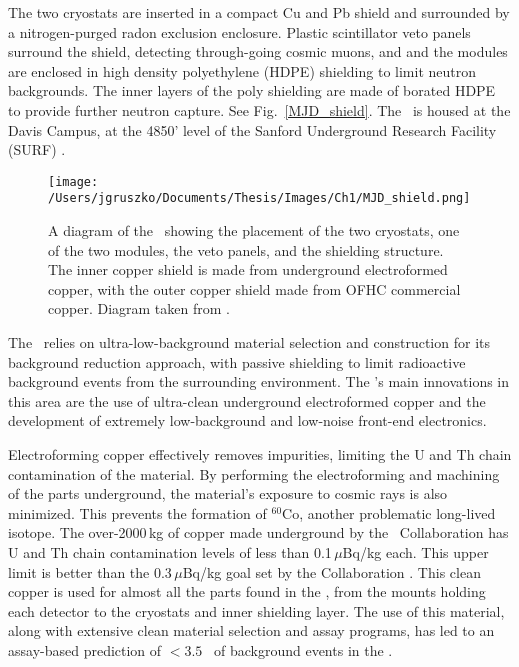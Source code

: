 The two cryostats are inserted in a compact Cu and Pb shield and surrounded by a nitrogen-purged radon exclusion enclosure. Plastic scintillator veto panels surround the shield, detecting through-going cosmic muons, and and the modules are enclosed in high density polyethylene (HDPE) shielding to limit neutron backgrounds. The inner layers of the poly shielding are made of borated HDPE to provide further neutron capture. See Fig.~\ref{MJD_shield}. The \DEM\ is housed at the Davis Campus, at the 4850' level of the Sanford Underground Research Facility (SURF) \cite{MJD2014}. 

\begin{figure}[t]
\centering
\texttt{[image: /Users/jgruszko/Documents/Thesis/Images/Ch1/MJD\_shield.png]}
\caption{A diagram of the \DEM\ showing the placement of the two cryostats, one of the two modules, the veto panels, and the shielding structure. The inner copper shield is made from underground electroformed copper, with the outer copper shield made from OFHC commercial copper. Diagram taken from \cite{MJD2014}.}
\label{fig:MJ_modular}
\end{figure}

The \DEM\ relies on ultra-low-background material selection and construction for its background reduction approach, with passive shielding to limit radioactive background events from the surrounding environment. The \DEM's main innovations in this area are the use of ultra-clean underground electroformed copper and the development of extremely low-background and low-noise front-end electronics. 

Electroforming copper effectively removes impurities, limiting the U and Th chain contamination of the material. By performing the electroforming and machining of the parts underground, the material's exposure to cosmic rays is also minimized. This prevents the formation of $^{60}$Co, another problematic long-lived isotope. The over-2000\,kg of copper made underground by the \MJ\ Collaboration has U and Th chain contamination levels of less than 0.1\,$\mu$Bq/kg each. This upper limit is better than the 0.3\,$\mu$Bq/kg goal set by the Collaboration \cite{MJD_assay}. This clean copper is used for almost all the parts found in the \DEM, from the mounts holding each detector to the cryostats and inner shielding layer. The use of this material, along with extensive clean material selection and assay programs, has led to an assay-based prediction of $< 3.5$ \cpRty\ of background events in the \DEM \cite{MJD_assay}. 

